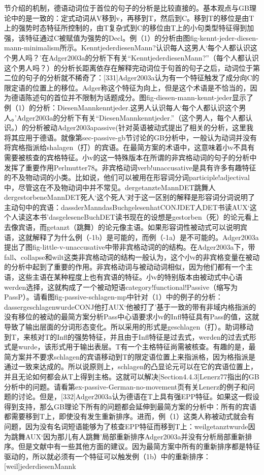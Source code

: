 节介绍的机制，德语动词位于首位的句子的分析是比较直接的。基本观点与GB理论中的是一致的：定式动词从V移到v，再移到T，然后到C。移到T的移位是由T上的强势时态特征所控制的，由T复杂式到C的移位由T上的小句类型特征得到加强，该特征通过C被赋值为强势的Decl。例（1）的分析由图fig-kennt-jeder-diesen-mann-minimalism所示。KenntjederdiesenMann?认识每人这男人`每个人都认识这个男人吗？'在Adger2003a的分析下有关“KenntjederdiesenMann?”（每个人都认识这个男人吗？）的分析长距离依存在解释完动词位于句首的句子之后，动词位于第二位的句子的分析就不稀奇了：[331]Adger2003a认为有一个特征触发了成分向C的限定语的位置上的移位。Adger称这个特征为向上，但是这个术语是不恰当的，因为德语陈述句的首位并不限制为话题成分。图fig-diesen-mann-kennt-jeder显示了例（1）的分析：DiesenMannkenntjeder.这男人认识每人`每个人都认识这个男人。'Adger2003a的分析下有关“DiesenMannkenntjeder.”（这个男人，每个人都认识。）的分析被动Adger2003apassive(针对英语被动式提出了相关的分析，这里我将其应用于德语。就像第sec-passive-gb节讨论的GB分析中，一般认为动词并没有将宾格指派给shalagen（打）的宾语。在最简方案的术语中，这意味着小v不具有需要被核查的宾格特征。小v的这一特殊版本在所谓的非宾格动词的句子的分析中发挥了重要作用Perlmutter78。非宾格动词verb!unaccusative是具有许多有趣特征的不及物动词的小类。比如说，他们可以被用在形容词分词participle!adjectival中，尽管这在不及物动词中并不常见。dergetanzteMannDET跳舞人dergestorbeneMannDET死人`这个死人'对于这一区别的解释是形容词分词说明了主动句中的宾语：dassderManndasBuchgelesenhatCONJDET人DET书读AUX`这个人读这本书'dasgeleseneBuchDET读书现在的设想是gestorben（死）的论元看上去像宾语，而getanzt（跳舞）的论元像主语。如果形容词性被动式可以说明宾语，这就解释了为什么例（-1b）是可能的，而例（-1a）是不可能的。Adger2003a提出了图fig-little-v-unaccusative中带非宾格动词的的结构。在Adger2003a下，带fall、collapse和wilt这类非宾格动词的结构一般认为，这个小v的非宾格变量在被动的分析中起到了重要的作用。非宾格动词与被动动词相似，因为他们都有一个主语，这些主语在某种程度上也有宾语的特征。小v的特别版本由被动式中心语werden选择，这就构成了一个被动短语category!functional!Passive（缩写为PassP）。请看图fig-passive-schlagen-mp中针对（1）中的例子的分析：dassergeschlagenwurdeCONJ他打AUX`他被打了'基于一致的带有非域内格指派的没有移位的被动的最简方案分析Pass中心语要求小v的Infl特征具有Pass的值，这就导致了输出层面的分词形态变化。所以采用的形式是geschlagen（打）。助词移动到T，来核对T的Infl的强势特征，并且由于Infl特征是过去式，werden的过去式形式是wurde，该形式用于输出表层。T有一个主格特征尚需被核查。有趣的是，最简方案并不要求schlagen的宾语移动到T的限定语位置上来指派格，因为格指派是通过一致来达成的。所以说原则上，schlagen的凸显论元可以在它的宾语位置上，并且无论如何都会从T上得到主格。这就可以解决[Section4.4.3]Lenerz77指出的GB分析中的问题。请看第ex-passive-German-no-movement页有关Lenerz的例子和问题的讨论。但是，[332]Adger2003a认为德语在T上具有强EPP特征。如果这一假设得到支持，那么GB理论下所有的问题都会延伸到最简方案的分析中：所有的宾语都需要移到T上，即使没有发生重新排序。进而，例（1）这类人称被动式就会有问题，因为没有名词短语能够为了核查EPP特征而移到T上：weilgetanztwurde因为跳舞AUX`因为那儿有人跳舞'局部重新排序Adger2003a并没有分析局部重新排序。但是文献中有一些其他方面的建议。因为最简方案中所有的重新排序都是特征驱动的，所以就必须有一个特征可以触发例（1b）中的重新排序：[weil]jederdiesenMannk